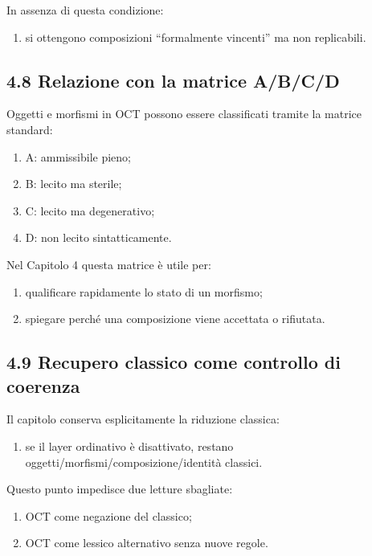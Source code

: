In assenza di questa condizione:

\begin{enumerate}
\def\labelenumi{\arabic{enumi}.}
\tightlist
\item
  si ottengono composizioni ``formalmente vincenti'' ma non replicabili.
\end{enumerate}

\subsection{4.8 Relazione con la matrice A/B/C/D}

Oggetti e morfismi in OCT possono essere classificati tramite la matrice standard:

\begin{enumerate}
\def\labelenumi{\arabic{enumi}.}
\tightlist
\item
  A: ammissibile pieno;
\item
  B: lecito ma sterile;
\item
  C: lecito ma degenerativo;
\item
  D: non lecito sintatticamente.
\end{enumerate}

Nel Capitolo 4 questa matrice è utile per:

\begin{enumerate}
\def\labelenumi{\arabic{enumi}.}
\tightlist
\item
  qualificare rapidamente lo stato di un morfismo;
\item
  spiegare perché una composizione viene accettata o rifiutata.
\end{enumerate}

\subsection{4.9 Recupero classico come controllo di coerenza}

Il capitolo conserva esplicitamente la riduzione classica:

\begin{enumerate}
\def\labelenumi{\arabic{enumi}.}
\tightlist
\item
  se il layer ordinativo è disattivato, restano oggetti/morfismi/composizione/identità classici.
\end{enumerate}

Questo punto impedisce due letture sbagliate:

\begin{enumerate}
\def\labelenumi{\arabic{enumi}.}
\tightlist
\item
  OCT come negazione del classico;
\item
  OCT come lessico alternativo senza nuove regole.
\end{enumerate}

